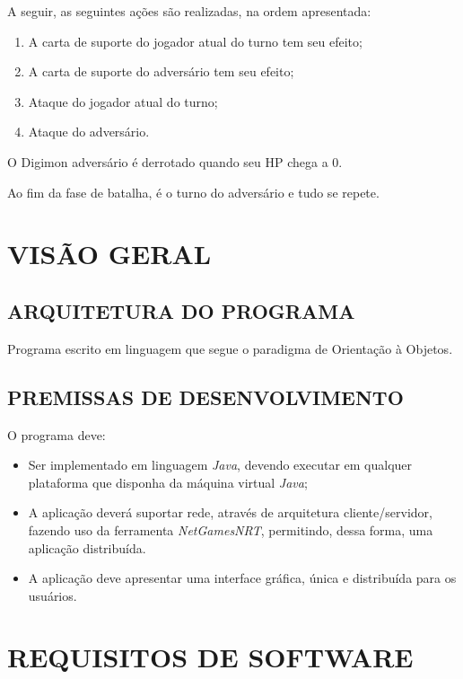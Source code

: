 \documentclass[12pt,a4paper,brazil,abntex2]{article}
\begin{document}
\begin{enumerate}
					A seguir, as seguintes ações são realizadas, na ordem apresentada:
						\begin{enumerate}
							\item A carta de suporte do jogador atual do turno tem seu efeito;
							\item A carta de suporte do adversário tem seu efeito;
							\item Ataque do jogador atual do turno;
							\item Ataque do adversário.
						\end{enumerate}

					O Digimon adversário é derrotado quando seu HP chega a 0.

					Ao fim da fase de batalha, é o turno do adversário e tudo se repete.
			\end{enumerate}
			
\newpage

\section{\normalsize VISÃO GERAL}
	\subsection{\normalsize ARQUITETURA DO PROGRAMA}

		Programa escrito em linguagem que segue o paradigma de Orientação à Objetos.
	
	\subsection{\normalsize PREMISSAS DE DESENVOLVIMENTO}
		
		O programa deve:		
		\begin{itemize}
			\item Ser implementado em linguagem \textit{Java}, devendo executar em qualquer plataforma que disponha da máquina virtual \textit{Java};
			\item A aplicação deverá suportar rede, através de arquitetura cliente/servidor, fazendo uso da ferramenta \textit{NetGamesNRT}, permitindo, dessa forma, uma aplicação distribuída.
			\item A aplicação deve apresentar uma interface gráfica, única e distribuída para os usuários.
		\end{itemize}
\newpage

\section{\normalsize REQUISITOS DE SOFTWARE}
\end{document}
